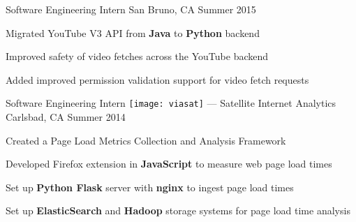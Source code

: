 \begin{cventries}

\cventry
{Software Engineering Intern} %
{\google}%
{San Bruno, CA} %
{Summer 2015} %
{ %
\begin{cvitems}
\item {Migrated YouTube V3 API from \textbf{Java} to \textbf{Python} backend}
\item {Improved safety of video fetches across the YouTube backend}
\item {Added improved permission validation support for video fetch requests}
\end{cvitems} 
}


\cventry
{Software Engineering Intern} %
{{\texttt{[image: viasat]}} --- Satellite Internet Analytics} %
{Carlsbad, CA} %
{Summer 2014} %
{ %
\begin{cvitems}
\item {Created a Page Load Metrics Collection and Analysis Framework}
\item {Developed Firefox extension in \textbf{JavaScript} to measure web page load times}
\item {Set up \textbf{Python Flask} server with \textbf{nginx} to ingest page load times}
\item {Set up \textbf{ElasticSearch} and \textbf{Hadoop} storage systems for page load time analysis}
\end{cvitems}
}


\end{cventries}

